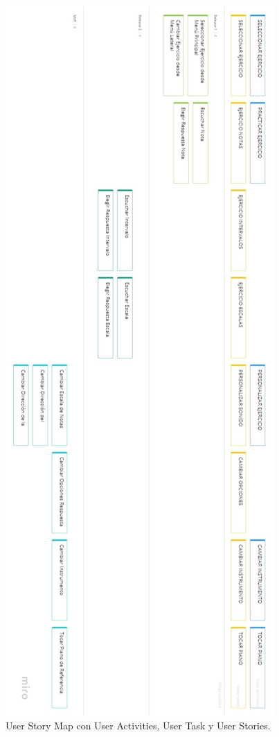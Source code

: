 \documentclass[12pt,twoside,titlepage]{report}
\begin{document}
{\begin{figure}[H]
    \centering
    \includegraphics[scale=0.52]{Scrum/User Stories/UserStoryMapRotate}
    \caption{User Story Map con User Activities, User Task y User Stories.}
    \label{fig:UserStoryMapRotate}
\end{figure}

}
\end{document}

